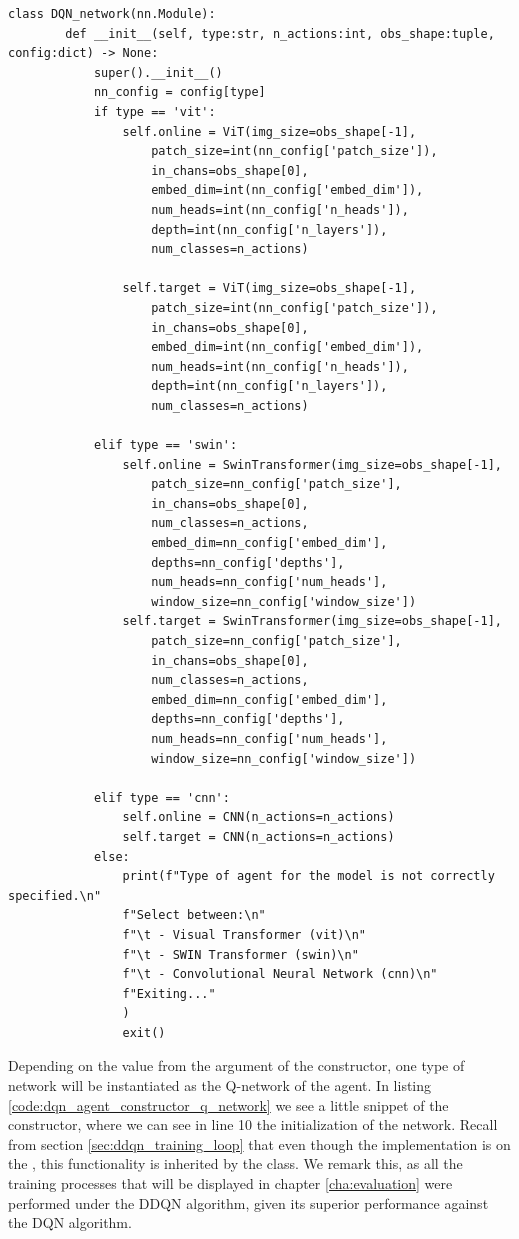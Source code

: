 \begin{lstlisting}[caption={Code for the Q\_network initialization}, label={code:q_networks_implementation}]
	class DQN_network(nn.Module):
		def __init__(self, type:str, n_actions:int, obs_shape:tuple, config:dict) -> None:
			super().__init__()
			nn_config = config[type]
			if type == 'vit':
				self.online = ViT(img_size=obs_shape[-1],
					patch_size=int(nn_config['patch_size']),
					in_chans=obs_shape[0],
					embed_dim=int(nn_config['embed_dim']),
					num_heads=int(nn_config['n_heads']),
					depth=int(nn_config['n_layers']),
					num_classes=n_actions)
				
				self.target = ViT(img_size=obs_shape[-1],
					patch_size=int(nn_config['patch_size']),
					in_chans=obs_shape[0],
					embed_dim=int(nn_config['embed_dim']),
					num_heads=int(nn_config['n_heads']),
					depth=int(nn_config['n_layers']),
					num_classes=n_actions)
					
			elif type == 'swin':
				self.online = SwinTransformer(img_size=obs_shape[-1], 
					patch_size=nn_config['patch_size'], 
					in_chans=obs_shape[0], 
					num_classes=n_actions, 
					embed_dim=nn_config['embed_dim'],
					depths=nn_config['depths'], 
					num_heads=nn_config['num_heads'], 
					window_size=nn_config['window_size'])
				self.target = SwinTransformer(img_size=obs_shape[-1], 
					patch_size=nn_config['patch_size'], 
					in_chans=obs_shape[0], 
					num_classes=n_actions, 
					embed_dim=nn_config['embed_dim'],
					depths=nn_config['depths'], 
					num_heads=nn_config['num_heads'], 
					window_size=nn_config['window_size'])
					
			elif type == 'cnn':
				self.online = CNN(n_actions=n_actions)
				self.target = CNN(n_actions=n_actions)
			else:
				print(f"Type of agent for the model is not correctly specified.\n"
				f"Select between:\n"
				f"\t - Visual Transformer (vit)\n"
				f"\t - SWIN Transformer (swin)\n"
				f"\t - Convolutional Neural Network (cnn)\n"
				f"Exiting..."
				)
				exit()
\end{lstlisting}

Depending on the  value from the argument of the constructor, one type of network will be instantiated as the Q-network of the agent. In listing \ref{code:dqn_agent_constructor_q_network} we see a little snippet of the  constructor, where we can see in line 10 the initialization of the network. Recall from section \ref{sec:ddqn_training_loop} that even though the implementation is on the , this functionality is inherited by the  class. We remark this, as all the training processes that will be displayed in chapter \ref{cha:evaluation} were performed under the DDQN algorithm, given its superior performance against the DQN algorithm.

